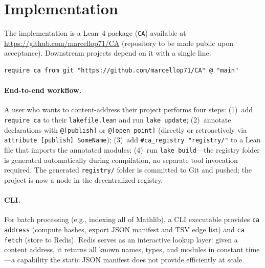 \section{Implementation}
\label{sec:impl}

The implementation is a Lean~4 package (\texttt{CA}) available at
\url{https://github.com/marcellop71/CA} (repository to be made public
upon acceptance).  Downstream projects depend on it with a single line:

\begin{lstlisting}[style=pseudo]
require ca from git "https://github.com/marcellop71/CA" @ "main"
\end{lstlisting}

\paragraph{End-to-end workflow.}  A user who wants to content-address
their project performs four steps: (1)~add \texttt{require ca} to their
\texttt{lakefile.lean} and run \texttt{lake update}; (2)~annotate
declarations with \texttt{@[publish]} or \texttt{@[open\_point]}
(directly or retroactively via \texttt{attribute [publish] SomeName});
(3)~add \texttt{\#ca\_registry "registry/"} to a Lean file that
imports the annotated modules; (4)~run \texttt{lake build}---the
registry folder is generated automatically during compilation, no
separate tool invocation required.  The generated \texttt{registry/}
folder is committed to Git and pushed; the project is now a node in the
decentralized registry.

\paragraph{CLI.}  For batch processing (e.g., indexing all of Mathlib),
a CLI executable provides \texttt{ca address} (compute hashes, export
JSON manifest and TSV edge list) and \texttt{ca fetch} (store to
Redis).  Redis serves as an interactive lookup layer: given a content
address, it returns all known names, types, and modules in
constant time---a capability the static JSON manifest does not provide
efficiently at scale.

